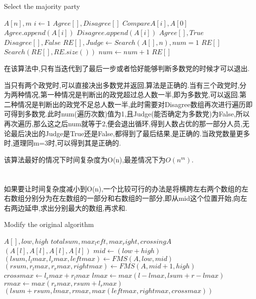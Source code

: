 \documentclass[12pt,a4paper]{ctexart}
\begin{document}
\begin{algorithm}
    \renewcommand{\algorithmicensure}{\textbf{Output:}}
    \renewcommand{\algorithmicrequire}{\textbf{Input:}}
    \caption{Select the majority party}
    \label{alg3}
    \begin{algorithmic}
        \Require $A[n],m$
        \State $i\gets 1$
        \State $Agree[],Disagree[]$
        \State $Compare A[i],A[0]$
        \State $Agree.append(A[i])$
        \Else \State $Disagree.append(A[i])$
        \EndIf
        \EndWhile
        \State \Return $Agree[],True$
        \Else
        \State \Return $Disagree[],False$
        \EndIf
        \EndFunction
        \State $RE[],Judge\gets Search(A[],n),num=1$
        \State \Return $RE[]$
        \Else {}
        \State $Search(RE[],RE.size())$
        \State $num\gets num+1$
        \EndWhile
        \EndIf
        \State \Return $RE[]$
    \end{algorithmic}
\end{algorithm}

在该算法中,只有当迭代到了最后一步或者恰好能够判断多数党的时候才可以退出.

当只有两个政党时,可以直接决出多数党并返回,算法是正确的.当有三个政党时,分为两种情况,第一种情况是判断出的政党超过总人数一半,即为多数党,可以返回.第二种情况是判断出的政党不足总人数一半,此时需要对Disagree数组再次进行遍历即可得到多数党.此时num(遍历次数)值为1,且Judge(能否确定为多数党)为False,所以再次遍历,那么这之后num就等于2,便会退出循环,得到人数占优的那一部分人员,无论最后决出的Judge是True还是False,都得到了最后结果,是正确的.当政党数量更多时,道理同m=3时,可以得到其是正确的.

该算法最好的情况下时间复杂度为O(n),最差情况下为$O(n^m)$.

\section{}
如果要让时间复杂度减小到O(n),一个比较可行的办法是将横跨左右两个数组的左右数组分别分为在左数组的一部分和右数组的一部分,即从mid这个位置开始,向左右两边延申,求出分别最大的数组,再求和.

\begin{algorithm}
    \caption{Modify the original algorithm}
    \label{alg1}
    \begin{algorithmic}
        \Require $A[],low,high$
        \Ensure $totalsum,max_left,max_right,crossingA$
        \State \Return $(A[l],A[l],A[l],A[l])$
        \EndIf
        \State $mid \gets (low+high)$
        \State $(lsum,l_lmax,l_rmax,leftmax)\gets FMS(A,low,mid)$
        \State $(rsum,r_lmax,r_rmax,rightmax)\gets FMS(A,mid+1,high)$
        \State $crossmax \gets l_rmax+r_lmax$
        \State $lmax\gets max(l-lmax,lsum+r-lmax)$
        \State $rmax\gets max(r_rmax,rsum+l_rmax)$
        \State \Return $(lsum+rsum,lmax,rmax,max(leftmax,rightmax,crossmax))$
    \end{algorithmic}
\end{algorithm}
\end{document}
